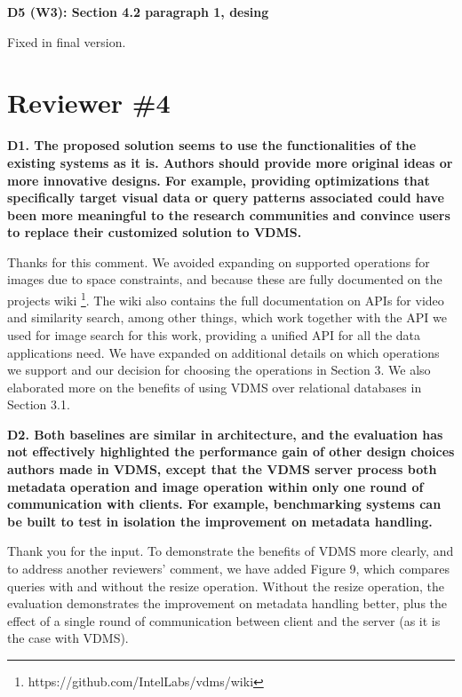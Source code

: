 \documentclass[11pt]{proposalnsf}
\begin{document}
\bigskip
\noindent %
\textbf{
D5 (W3): Section 4.2 paragraph 1, desing
}\bigskip

Fixed in final version.

\bigskip

\newpage
\section{Reviewer \#4}

\noindent %
\textbf{
D1. The proposed solution seems to use the functionalities of the existing systems
as it is. Authors should provide more original ideas or more innovative designs.
For example, providing optimizations that specifically target visual data or query
patterns associated could have been more meaningful to the research communities and
convince users to replace their customized solution to VDMS.
}\bigskip


Thanks for this comment.
We avoided expanding on supported operations for images due to space constraints,
and because these are fully documented on the projects wiki
\footnote{https://github.com/IntelLabs/vdms/wiki}.
The wiki also contains the full documentation on APIs for video and similarity
search, among other things, which work together with the API we used for
image search for this work, providing a unified API for all the data applications need.
We have expanded on additional details on which operations we support and our
decision for choosing the operations in Section 3.
We also elaborated more on the benefits of
using VDMS over relational databases in Section 3.1.

\bigskip
\noindent %
\textbf{
D2. Both baselines are similar in architecture, and the evaluation has not effectively
highlighted the performance gain of other design choices authors made in VDMS,
except that the VDMS server process both metadata operation and image operation
within only one round of communication with clients.
For example, benchmarking systems can be built to test in isolation the
improvement on metadata handling.
}\bigskip

Thank you for the input.
To demonstrate the benefits of VDMS more clearly, and to address another
reviewers' comment,  we have added Figure 9, which compares queries
with and without the resize operation.
Without the resize operation, the evaluation demonstrates the
improvement on metadata handling better, plus the effect of a single round
of communication between client and the server (as it is the case with VDMS).
\end{document}

